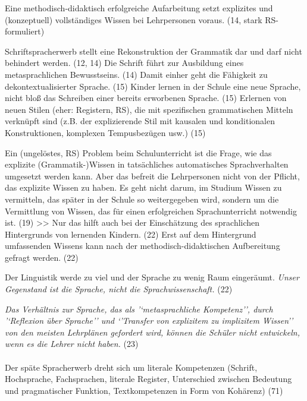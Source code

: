 Eine methodisch-didaktisch erfolgreiche Aufarbeitung setzt explizites und (konzeptuell) vollständiges Wissen bei Lehrpersonen voraus. (14, stark RS-formuliert)

Schriftspracherwerb stellt eine Rekonstruktion der Grammatik dar und darf nicht behindert werden. (12, 14)
Die Schrift führt zur Ausbildung eines metasprachlichen Bewusstseins. (14)
Damit einher geht die Fähigkeit zu dekontextualisierter Sprache. (15)
Kinder lernen in der Schule eine neue Sprache, nicht bloß das Schreiben einer bereits erworbenen Sprache. (15)
Erlernen von neuen Stilen (eher: Registern, RS), die mit spezifischen grammatischen Mitteln verknüpft sind (z.B. der explizierende Stil mit kausalen und konditionalen Konstruktionen, komplexen Tempusbezügen usw.) (15)

Ein (ungelöstes, RS) Problem beim Schulunterricht ist die Frage, wie das explizite (Grammatik-)Wissen in tatsächliches automatisches Sprachverhalten umgesetzt werden kann.
Aber das befreit die Lehrpersonen nicht von der Pflicht, das explizite Wissen zu haben.
Es geht nicht darum, im Studium Wissen zu vermitteln, das später in der Schule so weitergegeben wird, sondern um die Vermittlung von Wissen, das für einen erfolgreichen Sprachunterricht notwendig ist. (19)
>>
Nur das hilft auch bei der Einschätzung des sprachlichen Hintergrunds von lernenden Kindern. (22)
Erst auf dem Hintergrund umfassenden Wissens kann nach der methodisch-didaktischen Aufbereitung gefragt werden. (22)


Der Linguistik werde zu viel und der Sprache zu wenig Raum eingeräumt. 
\textit{Unser Gegenstand ist die Sprache, nicht die Sprachwissenschaft.} (22)

\textit{Das Verhältnis zur Sprache, das als '`metasprachliche Kompetenz'', durch '`Reflexion über Sprache'' und `'Transfer von explizitem zu implizitem Wissen'' von den meisten Lehrplänen gefordert wird, können die Schüler nicht entwickeln, wenn es die Lehrer nicht haben.} (23)


\paragraph{\citet{Portmanntselikas2011}}

Der späte Spracherwerb dreht sich um literale Kompetenzen (Schrift, Hochsprache, Fachsprachen, literale Register, Unterschied zwischen Bedeutung und pragmatischer Funktion, Textkompetenzen \zB in Form von Kohärenz) (71)

